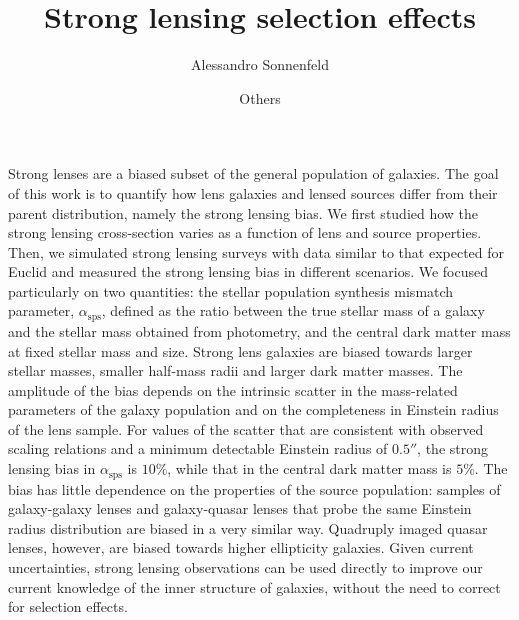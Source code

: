 \documentclass{aa}
\def\asps{\alpha_{\mathrm{sps}}}
\begin{document}
 


   \title{Strong lensing selection effects}

   \author{Alessandro Sonnenfeld\and
           Others
          }


   \date{}

 
  \abstract
    {
Strong lenses are a biased subset of the general population of galaxies.
}
   {
The goal of this work is to quantify how lens galaxies and lensed sources differ from their parent distribution, namely the strong lensing bias.
} 
   {
We first studied how the strong lensing cross-section varies as a function of lens and source properties. 
Then, we simulated strong lensing surveys with data similar to that expected for Euclid and measured the strong lensing bias in different scenarios.
We focused particularly on two quantities: the stellar population synthesis mismatch parameter, $\asps$, defined as the ratio between the true stellar mass of a galaxy and the stellar mass obtained from photometry, and the central dark matter mass at fixed stellar mass and size.
}
   {
Strong lens galaxies are biased towards larger stellar masses, smaller half-mass radii and larger dark matter masses.
The amplitude of the bias depends on the intrinsic scatter in the mass-related parameters of the galaxy population and on the completeness in Einstein radius of the lens sample.
For values of the scatter that are consistent with observed scaling relations and a minimum detectable Einstein radius of $0.5''$, the strong lensing bias in $\asps$ is $10\%$, while that in the central dark matter mass is $5\%$.
The bias has little dependence on the properties of the source population: samples of galaxy-galaxy lenses and galaxy-quasar lenses that probe the same Einstein radius distribution are biased in a very similar way.
Quadruply imaged quasar lenses, however, are biased towards higher ellipticity galaxies.
}
   {
Given current uncertainties, strong lensing observations can be used directly to improve our current knowledge of the inner structure of galaxies, without the need to correct for selection effects.
}
\end{document}
